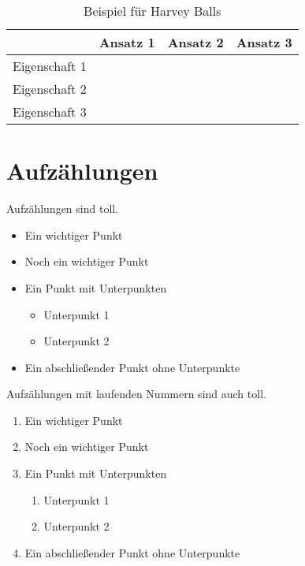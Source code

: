 \begin{table}[h]
  \caption{Beispiel für Harvey Balls}
  \label{tab:harveyexample}
  \centering
  \begin{tabular}{lccc}
    \toprule
    & Ansatz 1 & Ansatz 2 & Ansatz 3\\
    \midrule
    Eigenschaft 1	& \harveyBallNone & \harveyBallQuarter & \harveyBallHalf \\
    Eigenschaft 2	& \harveyBallHalf & \harveyBallThreeQuarter & \harveyBallFull \\
    Eigenschaft 3	& \harveyBallFull & \harveyBallThreeQuarter & \harveyBallQuarter\\
    \bottomrule
  \end{tabular}
\end{table}


\section{Aufzählungen}

Aufzählungen sind toll.

\begin{itemize}
  \item Ein wichtiger Punkt
  \item Noch ein wichtiger Punkt
  \item Ein Punkt mit Unterpunkten
    \begin{itemize}
      \item Unterpunkt 1
      \item Unterpunkt 2
    \end{itemize}
  \item Ein abschließender Punkt ohne Unterpunkte
\end{itemize}


Aufzählungen mit laufenden Nummern sind auch toll.

\begin{enumerate}
  \item Ein wichtiger Punkt
  \item Noch ein wichtiger Punkt
  \item Ein Punkt mit Unterpunkten
    \begin{enumerate}
      \item Unterpunkt 1
      \item Unterpunkt 2
    \end{enumerate}
  \item Ein abschließender Punkt ohne Unterpunkte
\end{enumerate}
